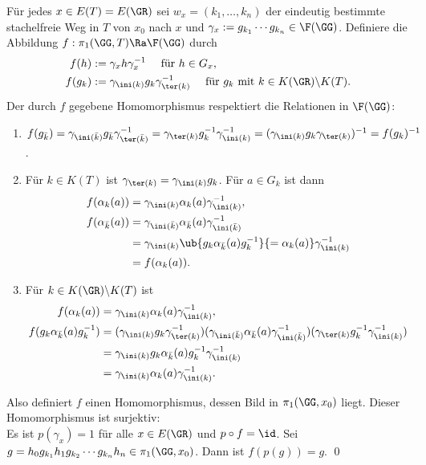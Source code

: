 \bew Für jedes $x\in E(T)=E(\GR)$ sei $w_x=(k_1,\ldots,k_n)$
der eindeutig bestimmte stachelfreie Weg in $T$ von $x_0$ nach $x$
und $\gamma_x:=g_{k_1}\cdots g_{k_n}\in\F(\GG)$.
Definiere die Abbildung $f:\pi_1(\GG,T)\Ra\F(\GG)$ durch
\begin{align*}
f(h) &:= \gamma_x h \gamma_x^{-1}\quad \text{ für } h\in G_x, \\
f(g_k) &:= \gamma_{\ini(k)} g_k \gamma_{\ter(k)}^{-1}
\quad \text{ für } g_k \text{ mit } k\in K(\GR)\backslash K(T).
\end{align*}
Der durch $f$ gegebene Homomorphismus respektiert die
Relationen in $\F(\GG)$:
\begin{enumerate}
\item $f(g_{\bar{k}})
=\gamma_{\ini(\bar{k})} g_{\bar{k}} \gamma_{\ter(\bar{k})}^{-1}
=\gamma_{\ter(k)} g_k^{-1}\gamma_{\ini(k)}^{-1}
=(\gamma_{\ini(k)} g_k \gamma_{\ter(k)})^{-1}
=f(g_k)^{-1}$.
\item Für $k\in K(T)$ ist $\gamma_{\ter(k)}=\gamma_{\ini(k)} g_k$.
Für $a\in G_k$ ist dann
\begin{align*}
f(\alpha_k(a)) &= \gamma_{\ini(k)} \alpha_k(a) \gamma_{\ini(k)}^{-1}, \\
f(\alpha_{\bar{k}}(a))
&= \gamma_{\ini(\bar{k})} \alpha_{\bar{k}}(a) \gamma_{\ini(\bar{k})}^{-1} \\
&= \gamma_{\ini(k)} \ub{g_k \alpha_{\bar{k}}(a) g_k^{-1}}{=\alpha_k(a)} \gamma_{\ini(k)}^{-1} \\
&= f(\alpha_k(a)).
\end{align*}
\item Für $k\in K(\GR)\backslash K(T)$ ist
\begin{align*}
f(\alpha_k(a)) &= \gamma_{\ini(k)} \alpha_k(a) \gamma_{\ini(k)}^{-1}, \\
f(g_k \alpha_{\bar{k}}(a) g_k^{-1})
&= (\gamma_{\ini(k)}g_k \gamma_{\ter(k)}^{-1})
(\gamma_{\ini(\bar{k})}\alpha_{\bar{k}}(a)\gamma_{\ini(\bar{k})}^{-1})
(\gamma_{\ter(k)}g_k^{-1}\gamma_{\ini(k)}^{-1})\\
&= \gamma_{\ini(k)} g_k \alpha_{\bar{k}}(a) g_k^{-1}\gamma_{\ini(k)}^{-1} \\
&= \gamma_{\ini(k)}\alpha_{k}(a)\gamma_{\ini(k)}^{-1}.
\end{align*}
\end{enumerate}
Also definiert $f$ einen Homomorphismus, dessen Bild in
$\pi_1(\GG,x_0)$ liegt. Dieser Homomorphismus ist surjektiv:\\
Es ist $p(\gamma_x)=1$ für alle $x\in E(\GR)$ und $p\circ f=\id$.
Sei $g=h_0 g_{k_1} h_1 g_{k_2} \cdots g_{k_n} h_n\in\pi_1(\GG,x_0)$.
Dann ist
$f(p(g))=g$.
\qed

